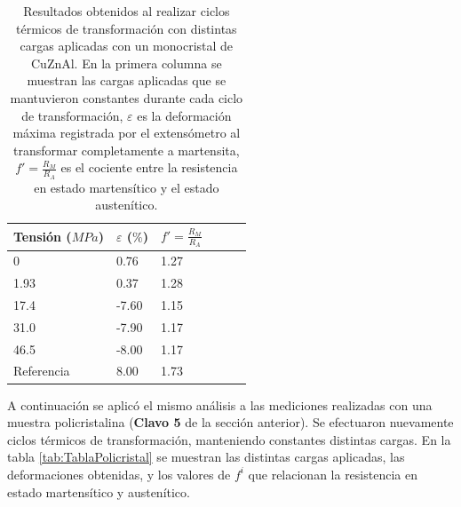 \documentclass[a4paper,12pt,fleqn,twoside,openany]{book}
\begin{document}
\begin{table} 
\begin{center} 
\begin{tabular}{@{}llllll@{}} \toprule
Tensión ($MPa$) & $\varepsilon$ ($\%$) &  $f'=\frac{R_M}{R_A}$\\ \midrule
 0        &  0.76   & 1.27\\
 1.93       &  0.37   & 1.28\\
 17.4      &  -7.60  & 1.15\\
 31.0      &  -7.90  & 1.17\\
 46.5     &  -8.00  & 1.17  \\
 Referencia \cite{resistencia}    & 8.00  &  1.73   \\
 \bottomrule
\end{tabular}
\caption{Resultados obtenidos al realizar ciclos térmicos de transformación con distintas cargas aplicadas con un monocristal de CuZnAl. En la primera columna se muestran las cargas aplicadas que se mantuvieron constantes durante cada ciclo de transformación, $\varepsilon$ es la deformación máxima registrada por el extensómetro al transformar completamente a martensita, $f'=\frac{R_M}{R_A}$ es el cociente entre la resistencia en estado martensítico y el estado austenítico.}
\label{tab:TablaMonocristal}
\end{center}
\end{table}


A continuación se aplicó el mismo análisis a las mediciones realizadas con una muestra policristalina (\textbf{Clavo 5} de la sección anterior). Se efectuaron nuevamente ciclos térmicos de transformación, manteniendo constantes distintas cargas. En la tabla \ref{tab:TablaPolicristal} se muestran las distintas cargas aplicadas, las deformaciones obtenidas, y los valores de $f^i$ que relacionan la resistencia en estado martensítico y austenítico. 
\end{document}

